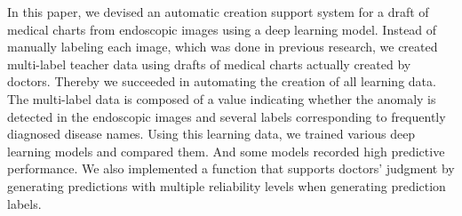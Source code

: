 In this paper, we devised an automatic creation support system for a draft of medical charts from endoscopic images using a deep learning model.
Instead of manually labeling each image, which was done in previous research, we created multi-label teacher data using drafts of medical charts actually created by doctors.
Thereby we succeeded in automating the creation of all learning data. 
The multi-label data is composed of a value indicating whether the anomaly is detected in the endoscopic images and several labels corresponding to frequently diagnosed disease names.
Using this learning data, we trained various deep learning models and compared them.
And some models recorded high predictive performance.
We also implemented a function that supports doctors' judgment by generating predictions with multiple reliability levels when generating prediction labels.
